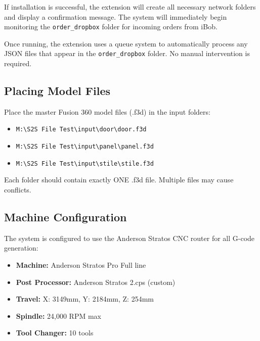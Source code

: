 \documentclass[11pt,letterpaper]{article}
\begin{document}
\begin{tcolorbox}[colback=green!5!white,colframe=green!75!black,title=Success]
If installation is successful, the extension will create all necessary network folders and display a confirmation message. The system will immediately begin monitoring the \texttt{order\_dropbox} folder for incoming orders from iBob.
\end{tcolorbox}

\begin{tcolorbox}[colback=blue!5!white,colframe=blue!75!black,title=Automatic Processing]
Once running, the extension uses a queue system to automatically process any JSON files that appear in the \texttt{order\_dropbox} folder. No manual intervention is required.
\end{tcolorbox}

\subsection{Placing Model Files}

Place the master Fusion 360 model files (.f3d) in the input folders:

\begin{itemize}
    \item \texttt{M:\textbackslash S2S File Test\textbackslash input\textbackslash door\textbackslash door.f3d}
    \item \texttt{M:\textbackslash S2S File Test\textbackslash input\textbackslash panel\textbackslash panel.f3d}
    \item \texttt{M:\textbackslash S2S File Test\textbackslash input\textbackslash stile\textbackslash stile.f3d}
\end{itemize}

\begin{tcolorbox}[colback=yellow!5!white,colframe=orange!75!black,title=Important]
Each folder should contain exactly ONE .f3d file. Multiple files may cause conflicts.
\end{tcolorbox}

\subsection{Machine Configuration}

The system is configured to use the Anderson Stratos CNC router for all G-code generation:

\begin{itemize}
    \item \textbf{Machine:} Anderson Stratos Pro Full line
    \item \textbf{Post Processor:} Anderson Stratos 2.cps (custom)
    \item \textbf{Travel:} X: 3149mm, Y: 2184mm, Z: 254mm
    \item \textbf{Spindle:} 24,000 RPM max
    \item \textbf{Tool Changer:} 10 tools
\end{itemize}
\end{document}
